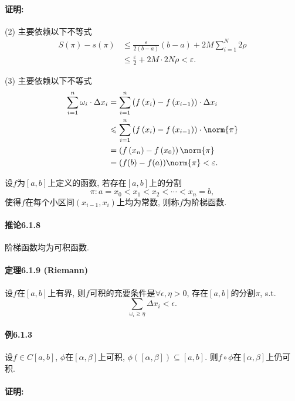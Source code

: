 \paragraph{证明:}

(2) 主要依赖以下不等式
\[
\begin{aligned}S(\pi)-s(\pi) & \leqslant\frac{\varepsilon}{2(b-a)}(b-a)+2M\sum_{i=1}^{N}2\rho\\
 & \leqslant\frac{\varepsilon}{2}+2M\cdot2N\rho<\varepsilon.
\end{aligned}
\]

(3) 主要依赖以下不等式
\[
\begin{aligned}\sum_{i=1}^{n}\omega_{i}\cdot\Delta x_{i} & =\sum_{i=1}^{n}\left(f\left(x_{i}\right)-f\left(x_{i-1}\right)\right)\cdot\Delta x_{i}\\
 & \leqslant\sum_{i=1}^{n}\left(f\left(x_{i}\right)-f\left(x_{i-1}\right)\right)\cdot\norm{\pi}\\
 & =\left(f\left(x_{n}\right)-f\left(x_{0}\right)\right)\norm{\pi}\\
 & =(f(b)-f(a))\norm{\pi}<\varepsilon.
\end{aligned}
\]

设$f$为$[a,b]$上定义的函数, 若存在$[a,b]$上的分割
\[
\pi:a=x_{0}<x_{1}<x_{2}<\cdots<x_{n}=b,
\]
使得$f$在每个小区间$(x_{i-1},x_{i})$上均为常数, 则称$f$为阶梯函数.

\paragraph{推论6.1.8}

阶梯函数均为可积函数.

\paragraph{定理6.1.9 (Riemann)}

设$f$在$[a,b]$上有界, 则$f$可积的充要条件是$\forall\epsilon,\eta>0$, 存在$[a,b]$的分割$\pi$,
s.t.
\[
\sum_{\omega_{i}\ge\eta}\Delta x_{i}<\epsilon.
\]


\paragraph{例6.1.3}

设$f\in C[a,b]$, $\phi$在$[\alpha,\beta]$上可积, $\phi([\alpha,\beta])\subseteq[a,b]$.
则$f\circ\phi$在$[\alpha,\beta]$上仍可积.

\paragraph{证明:}


